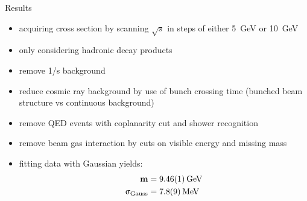 \begin{frame}{Results}
	
	\begin{minipage}[c][.4\textheight]{0.65\textwidth}
		\begin{itemize}\itemfill
			\item acquiring cross section by scanning $\sqrt{s}$ in steps of either \SI{5}{\giga\electronvolt} or \SI{10}{\giga\electronvolt}
			\item only considering hadronic decay products
			\item remove 1/s background
			\item reduce cosmic ray background by use of bunch crossing time (bunched beam structure vs continuous background)
		\end{itemize}
	\end{minipage}
	\begin{minipage}{.31\textwidth}
	\end{minipage}
	
	\begin{itemize}\itemfill
		\item remove QED events with coplanarity cut and shower recognition
		\item remove beam gas interaction by cuts on visible energy and missing mass
		\item fitting data with Gaussian yields:
		{\begin{align*}
			\z{\textbf{m}} &= \textbf{\SI{9.46\pm.01}{\giga\electronvolt}}\\
			\mathbf{\upsigma_{\z{Gauss}}} &= \textbf{\SI{7.8\pm.9}{\mega\electronvolt}}
		\end{align*}}
	\end{itemize}\vspace*{-20pt}

	
\end{frame}
